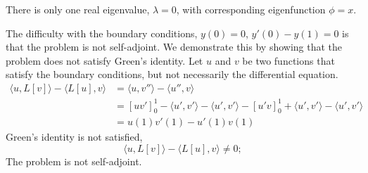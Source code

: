 {\begin{Solution}
  There is only one real eigenvalue, $\lambda = 0$, with corresponding 
  eigenfunction $\phi = x$.

  The difficulty with the boundary conditions, $y(0) = 0$, $y'(0) - y(1) = 0$
  is that the problem is not self-adjoint.  
  We demonstrate this by showing that the problem does
  not satisfy Green's identity.  Let $u$ and $v$ be two functions that 
  satisfy the boundary conditions, but not necessarily the differential 
  equation.
  \begin{align*}
    \langle u, L[v] \rangle - \langle L[u], v \rangle
    &= \langle u, v'' \rangle - \langle u'', v \rangle \\
    &= \left[ u v' \right]_0^1 - \langle u', v' \rangle - \langle u', v' \rangle 
    - \left[ u' v \right]_0^1 + \langle u', v' \rangle - \langle u', v' \rangle \\
    &= u(1) v'(1) - u'(1) v(1)
  \end{align*}
  Green's identity is not satisfied,
  \[
  \langle u, L[v] \rangle - \langle L[u], v \rangle \neq 0;
  \]
  The problem is not self-adjoint.
\end{Solution}











}
